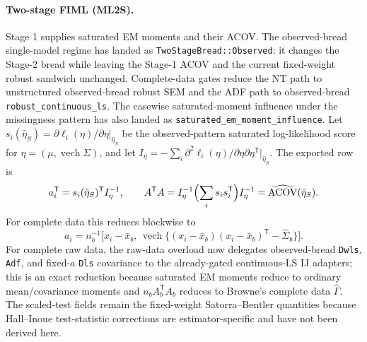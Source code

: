 \documentclass[11pt]{article}
\newcommand{\vech}{\operatorname{vech}}
\newcommand{\T}{^{\mathsf T}}
\theoremstyle{plain}
\theoremstyle{remark}
\begin{document}
\paragraph{Two-stage FIML (ML2S).}
Stage 1 supplies saturated EM moments and their ACOV. The observed-bread
single-model regime has landed as \texttt{TwoStageBread::Observed}: it changes
the Stage-2 bread while leaving the Stage-1 ACOV and the current fixed-weight
robust sandwich unchanged. Complete-data gates reduce the NT path to
unstructured observed-bread robust SEM and the ADF path to observed-bread
\texttt{robust\_continuous\_ls}. The casewise saturated-moment influence under
the missingness pattern has also landed as
\texttt{saturated\_em\_moment\_influence}. Let
$s_i(\hat\eta_S)=\partial \ell_i(\eta)/\partial\eta|_{\hat\eta_S}$ be the
observed-pattern saturated log-likelihood score for
$\eta=(\mu,\vech\Sigma)$, and let
$I_\eta=-\sum_i \partial^2\ell_i(\eta)/\partial\eta\partial\eta\T|_{\hat\eta_S}$.
The exported row is
\begin{equation}
  a_i\T = s_i(\hat\eta_S)\T I_\eta^{-1},
  \qquad
  A\T A = I_\eta^{-1}\Bigl(\sum_i s_i s_i\T\Bigr)I_\eta^{-1}
        = \widehat{\mathrm{ACOV}}(\hat\eta_S).
\end{equation}
For complete data this reduces blockwise to
\[
  a_i = n_b^{-1}\bigl[x_i-\bar x_b,\,
        \vech\{(x_i-\bar x_b)(x_i-\bar x_b)\T-\hat\Sigma_b\}\bigr].
\]
For complete raw data, the raw-data 
overload now delegates observed-bread \texttt{Dwls}, \texttt{Adf}, and
fixed-$a$ \texttt{Dls} covariance to the already-gated continuous-LS IJ
adapters; this is an exact reduction because saturated EM moments reduce to
ordinary mean/covariance moments and $n_bA_b\T A_b$ reduces to Browne's complete
data $\hat\Gamma$. The scaled-test fields remain the fixed-weight
Satorra--Bentler quantities because Hall--Inoue test-statistic corrections are
estimator-specific and have not been derived here.
\end{document}
